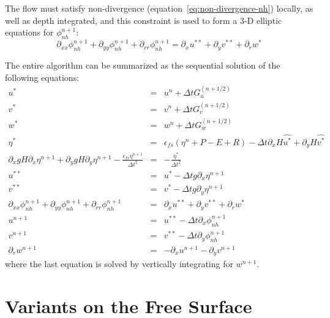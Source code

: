 The flow must satisfy non-divergence
(equation~\ref{eq:non-divergence-nh}) locally, as well as depth
integrated, and this constraint is used to form a 3-D elliptic
equations for $\phi_{nh}^{n+1}$:
\begin{equation}
\partial_{xx} \phi_{nh}^{n+1} + \partial_{yy} \phi_{nh}^{n+1} + 
\partial_{rr} \phi_{nh}^{n+1} =
\partial_x u^{**} + \partial_y v^{**} + \partial_r w^{*}
\end{equation}

The entire algorithm can be summarized as the sequential solution of
the following equations:
\begin{eqnarray}
u^{*} & = & u^{n} + \Delta t G_u^{(n+1/2)} \label{eq:ustar-nh} \\
v^{*} & = & v^{n} + \Delta t G_v^{(n+1/2)} \label{eq:vstar-nh} \\
w^{*} & = & w^{n} + \Delta t G_w^{(n+1/2)} \label{eq:wstar-nh} \\
\eta^* & = & \epsilon_{fs} \left( \eta^{n} +P-E+R \right)- \Delta t 
  \partial_x H \widehat{u^{*}}
+ \partial_y H \widehat{v^{*}}
\\
  \partial_x g H \partial_x \eta^{n+1}
+ \partial_y g H \partial_y \eta^{n+1}
- \frac{\epsilon_{fs} \eta^{n+1}}{\Delta t^2}
& = &
- \frac{\eta^*}{\Delta t^2}
\label{eq:elliptic-nh}
\\
u^{**} & = & u^{*} - \Delta t g \partial_x \eta^{n+1} \label{eq:unx-nh}\\
v^{**} & = & v^{*} - \Delta t g \partial_y \eta^{n+1} \label{eq:vnx-nh}\\
\partial_{xx} \phi_{nh}^{n+1} + \partial_{yy} \phi_{nh}^{n+1} + 
\partial_{rr} \phi_{nh}^{n+1} & = &
\partial_x u^{**} + \partial_y v^{**} + \partial_r w^{*} \\
u^{n+1} & = & u^{**} - \Delta t \partial_x \phi_{nh}^{n+1} \label{eq:un+1-nh}\\
v^{n+1} & = & v^{**} - \Delta t \partial_y \phi_{nh}^{n+1} \label{eq:vn+1-nh}\\
\partial_r w^{n+1} & = & - \partial_x u^{n+1} - \partial_y v^{n+1}
\end{eqnarray}
where the last equation is solved by vertically integrating for
$w^{n+1}$. 



\section{Variants on the Free Surface}

